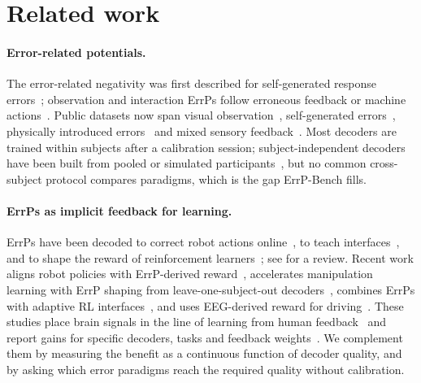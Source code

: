 \section{Related work}
\label{sec:related}

\paragraph{Error-related potentials.} The error-related negativity was first described for self-generated
response errors~\citep{falkenstein1991effects,gehring1993neural}; observation and interaction ErrPs follow
erroneous feedback or machine actions~\citep{chavarriaga2010learning,chavarriaga2014errare}. Public datasets now
span visual observation~\citep{ehrlich2019feasibility,chavarriaga2010learning}, self-generated
errors~\citep{kappenman2021erpcore}, physically introduced errors~\citep{kueper2024eegemg,chari2024interhri} and
mixed sensory feedback~\citep{liu2026decoding}. Most decoders are trained within subjects after a calibration
session; subject-independent decoders have been built from pooled or simulated
participants~\citep{fidencio2024generic}, but no common cross-subject protocol compares paradigms, which is the
gap ErrP-Bench fills.

\paragraph{ErrPs as implicit feedback for learning.} ErrPs have been decoded to correct robot actions
online~\citep{salazargomez2017correcting}, to teach interfaces~\citep{iturrate2015teaching}, and to shape the
reward of reinforcement learners~\citep{kim2017intrinsic,akinola2020accelerated,xu2021accelerating}; see
\citet{fidencio2022errorrelated} for a review. Recent work aligns robot policies with ErrP-derived
reward~\citep{kim2025aligning}, accelerates manipulation learning with ErrP shaping from leave-one-subject-out
decoders~\citep{kim2026accelerating}, combines ErrPs with adaptive RL interfaces~\citep{fidencio2025hybrid}, and
uses EEG-derived reward for driving~\citep{zhuang2026neurocognitive}. These studies place brain signals in the line of learning from human
feedback~\citep{knox2009tamer,christiano2017deep} and report gains for specific decoders, tasks and feedback
weights~\citep{kim2026accelerating}. We complement them by measuring the benefit as a continuous function of
decoder quality, and by asking which error paradigms reach the required quality without calibration.

